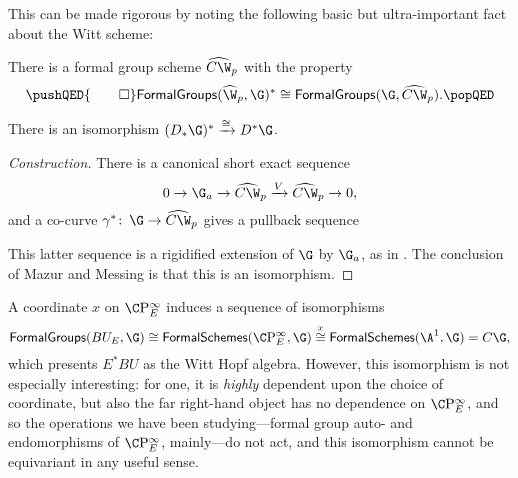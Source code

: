 This can be made rigorous by noting the following basic but ultra-important fact about the Witt scheme:
\begin{lemma}
There is a formal group scheme $\widehat{C\W}_p$ with the property
\[\pushQED{\qed}
\CatOf{FormalGroups}(\widehat{\W}_p, \G)^* \cong \CatOf{FormalGroups}(\G, \widehat{C\W}_p). \qedhere
\popQED\]
\end{lemma}

\begin{corollary}
There is an isomorphism $(D_* \G)^* \xrightarrow\cong D^* \G$.
\end{corollary}
\begin{proof}[Construction]
There is a canonical short exact sequence \[0 \to \G_a \to \widehat{C\W}_p \xrightarrow{V} \widehat{C\W}_p \to 0,\] and a co-curve $\gamma^*\co \G \to \widehat{C\W}_p$ gives a pullback sequence
\begin{center}
\end{center}
This latter sequence is a rigidified extension of $\G$ by $\G_a$, as in .  The conclusion of Mazur and Messing is that this is an isomorphism.
\end{proof}

\begin{remark}
A coordinate $x$ on $\CP^\infty_E$ induces a sequence of isomorphisms \[\CatOf{FormalGroups}(BU_E, \G) \cong \CatOf{FormalSchemes}(\CP^\infty_E, \G) \stackrel{x}{\cong} \CatOf{FormalSchemes}(\A^1, \G) = C\G,\] which presents $E^* BU$ as the Witt Hopf algebra.  However, this isomorphism is not especially interesting: for one, it is \emph{highly} dependent upon the choice of coordinate, but also the far right-hand object has no dependence on $\CP^\infty_E$, and so the operations we have been studying---formal group auto- and endomorphisms of $\CP^\infty_E$, mainly---do not act, and this isomorphism cannot be equivariant in any useful sense.
\end{remark}

